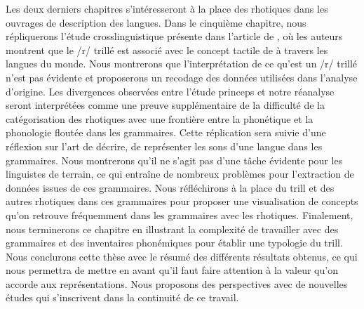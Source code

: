Les deux derniers chapitres s'intéresseront à la place des rhotiques dans les ouvrages de description des langues. Dans le cinquième chapitre, nous répliquerons l'étude crosslinguistique présente dans l'article de \textcite{winterTrilledAssociatedRoughness2022}, où les auteurs montrent que le /r/ trillé est associé avec le concept tactile de  à travers les langues du monde. Nous montrerons que l'interprétation de ce qu'est un /r/ trillé n'est pas évidente et proposerons un recodage des données utilisées dans l'analyse d'origine. 
Les divergences observées entre l'étude princeps et notre réanalyse seront interprétées comme une preuve supplémentaire de la difficulté de la catégorisation des rhotiques avec une frontière entre la phonétique et la phonologie floutée dans les grammaires.
Cette réplication sera suivie d'une réflexion sur l'art de décrire, de représenter les sons d'une langue dans les grammaires. Nous montrerons qu'il ne s'agit pas d'une tâche évidente pour les linguistes de terrain, ce qui entraîne de nombreux problèmes pour l'extraction de données issues de ces grammaires. Nous réfléchirons à la place du trill et des autres rhotiques dans ces grammaires pour proposer une visualisation de concepts qu'on retrouve fréquemment dans les grammaires avec les rhotiques. Finalement, nous terminerons ce chapitre en illustrant la complexité de travailler avec des grammaires et des inventaires phonémiques pour établir une typologie du trill.\\

Nous conclurons cette thèse avec le résumé des différents résultats obtenus, ce qui nous permettra de mettre en avant qu'il faut faire attention à la valeur qu'on accorde aux représentations. Nous proposons des perspectives avec de nouvelles études qui s'inscrivent dans la continuité de ce travail.












